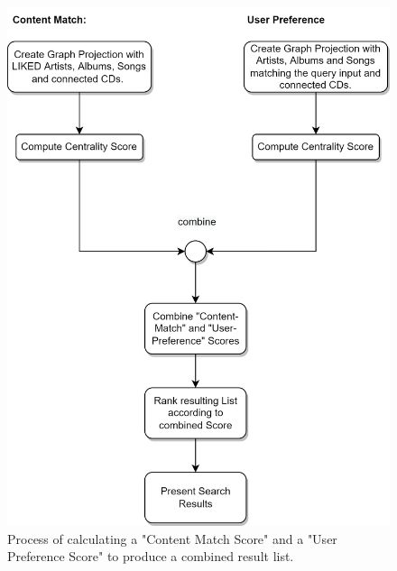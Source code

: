 \documentclass{article}
\begin{document}
\begin{figure}[ht]
    \centering
    \includegraphics[width=11.5cm]{../Figures/search.png}
    \caption{Process of calculating a "Content Match Score" and a "User Preference Score" to produce a combined result list. }
\end{figure}



% 
\end{document}
